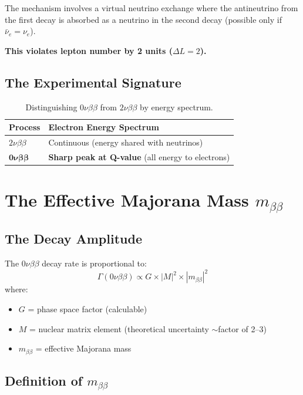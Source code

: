 \documentclass[12pt,a4paper]{article}
\begin{document}
The mechanism involves a virtual neutrino exchange where the antineutrino from the first decay is absorbed as a neutrino in the second decay (possible only if $\bar{\nu}_e = \nu_e$).

\textbf{This violates lepton number by 2 units ($\Delta L = 2$).}

\subsection{The Experimental Signature}

\begin{table}[h]
\centering
\begin{tabular}{@{}ll@{}}
\toprule
Process & Electron Energy Spectrum \\
\midrule
$2\nu\beta\beta$ & Continuous (energy shared with neutrinos) \\
$\mathbf{0\nu\beta\beta}$ & \textbf{Sharp peak at Q-value} (all energy to electrons) \\
\bottomrule
\end{tabular}
\caption{Distinguishing $0\nu\beta\beta$ from $2\nu\beta\beta$ by energy spectrum.}
\end{table}

\section{The Effective Majorana Mass $m_{\beta\beta}$}

\subsection{The Decay Amplitude}

The $0\nu\beta\beta$ decay rate is proportional to:
\begin{equation}
\Gamma(0\nu\beta\beta) \propto G \times |M|^2 \times |m_{\beta\beta}|^2
\end{equation}
where:
\begin{itemize}
\item $G$ = phase space factor (calculable)
\item $M$ = nuclear matrix element (theoretical uncertainty $\sim$factor of 2--3)
\item $m_{\beta\beta}$ = effective Majorana mass
\end{itemize}

\subsection{Definition of $m_{\beta\beta}$}
\end{document}
